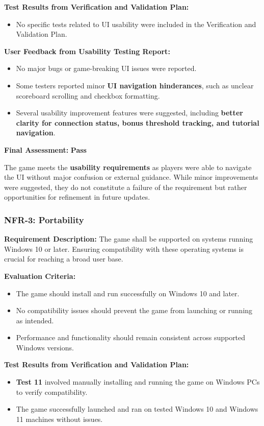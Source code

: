 \documentclass[12pt, titlepage]{article}
\begin{document}
\textbf{Test Results from Verification and Validation Plan:}  
\begin{itemize}
    \item No specific tests related to UI usability were included in the Verification and Validation Plan.
\end{itemize}

\textbf{User Feedback from Usability Testing Report:}  
\begin{itemize}
    \item No major bugs or game-breaking UI issues were reported.
    \item Some testers reported minor \textbf{UI navigation hinderances}, such as unclear scoreboard scrolling and checkbox formatting.
    \item Several usability improvement features were suggested, including \textbf{better clarity for connection status, bonus threshold tracking, and tutorial navigation}.
\end{itemize}

\textbf{Final Assessment:} \textbf{Pass}  

The game meets the \textbf{usability requirements} as players were able to navigate the UI without major confusion or external guidance. While minor improvements were suggested, they do not constitute a failure of the requirement but rather opportunities for refinement in future updates.

\subsubsection{NFR-3: Portability}

\textbf{Requirement Description:}  
The game shall be supported on systems running Windows 10 or later. Ensuring compatibility with these operating systems is crucial for reaching a broad user base.

\textbf{Evaluation Criteria:}  
\begin{itemize}
    \item The game should install and run successfully on Windows 10 and later.
    \item No compatibility issues should prevent the game from launching or running as intended.
    \item Performance and functionality should remain consistent across supported Windows versions.
\end{itemize}

\textbf{Test Results from Verification and Validation Plan:}  
\begin{itemize}
    \item \textbf{Test 11} involved manually installing and running the game on Windows PCs to verify compatibility.
    \item The game successfully launched and ran on tested Windows 10 and Windows 11 machines without issues.
\end{itemize}
\end{document}
